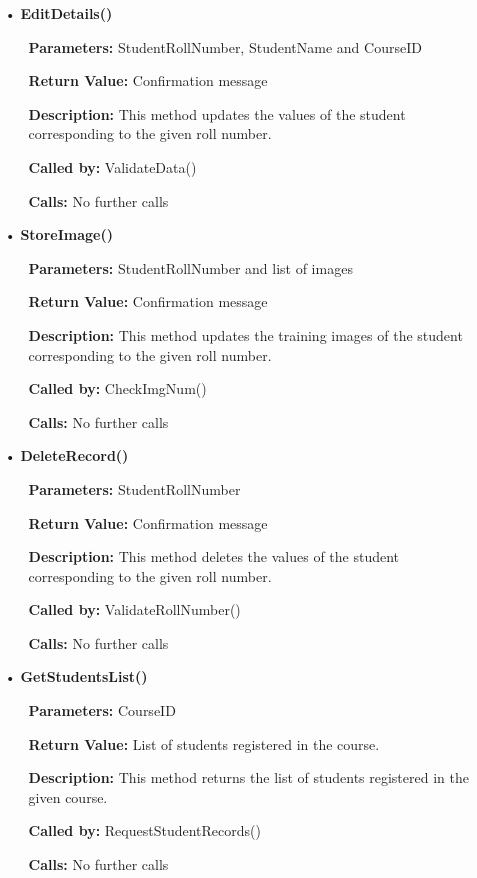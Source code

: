 \documentclass{scrreprt}
\begin{document}
\begin{enumerate}
\begin{itemize}
\item [•] \textbf{EditDetails()}
\begin{itemize}
\item [] \textbf{Parameters:} StudentRollNumber, StudentName and CourseID
\item [] \textbf{Return Value:} Confirmation message
\item [] \textbf{Description:} This method updates the values of the student corresponding to the given roll number.
\item [] \textbf{Called by:} ValidateData()
\item [] \textbf{Calls:} No further calls
\end{itemize}

\item [•] \textbf{StoreImage()}
\begin{itemize}	
\item [] \textbf{Parameters:} StudentRollNumber and list of images
\item [] \textbf{Return Value:} Confirmation message
\item [] \textbf{Description:} This method updates the training images of the student corresponding to the given roll number.
\item [] \textbf{Called by:} CheckImgNum()
\item [] \textbf{Calls:} No further calls
\end{itemize}

\item [•] \textbf{DeleteRecord()}
\begin{itemize}	
\item [] \textbf{Parameters:} StudentRollNumber
\item [] \textbf{Return Value:} Confirmation message
\item [] \textbf{Description:} This method deletes the values of the student corresponding to the given roll number.
\item [] \textbf{Called by:} ValidateRollNumber()
\item [] \textbf{Calls:} No further calls
\end{itemize}

\item [•] \textbf{GetStudentsList()}
\begin{itemize}	
\item [] \textbf{Parameters:} CourseID
\item [] \textbf{Return Value:} List of students registered in the course.
\item [] \textbf{Description:} This method returns the list of students registered in the given course.
\item [] \textbf{Called by:} RequestStudentRecords()
\item [] \textbf{Calls:} No further calls
\end{itemize}


\end{itemize}
\end{enumerate}
\end{document}
